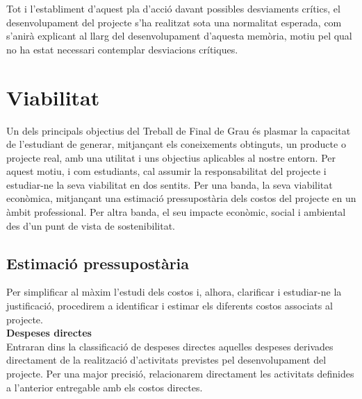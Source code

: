 Tot i l'establiment d'aquest pla d'acció davant possibles desviaments crítics, el desenvolupament del projecte s'ha realitzat sota una normalitat esperada, com s'anirà explicant al llarg del desenvolupament d'aquesta memòria, motiu pel qual no ha estat necessari contemplar desviacions crítiques.


\section{Viabilitat}

Un dels principals objectius del Treball de Final de Grau és plasmar la capacitat de l'estudiant de generar, mitjançant els coneixements obtinguts, un producte o projecte real, amb una utilitat i uns objectius aplicables al nostre entorn. Per aquest motiu, i com estudiants, cal assumir la responsabilitat del projecte i estudiar-ne la seva viabilitat en dos sentits. Per una banda, la seva viabilitat econòmica, mitjançant una estimació pressupostària dels costos del projecte en un àmbit professional. Per altra banda, el seu impacte econòmic, social i ambiental des d'un punt de vista de sostenibilitat.


\subsection{Estimació pressupostària}

Per simplificar al màxim l’estudi dels costos i, alhora, clarificar i estudiar-ne la justificació, procedirem a identificar i estimar els diferents costos associats al projecte.\\

\noindent \textbf{\large Despeses directes}\\

\noindent Entraran dins la classificació de despeses directes aquelles despeses derivades directament de la realització d’activitats previstes pel desenvolupament del projecte. Per una major precisió, relacionarem directament les activitats definides a l’anterior entregable amb els costos directes.  \\

